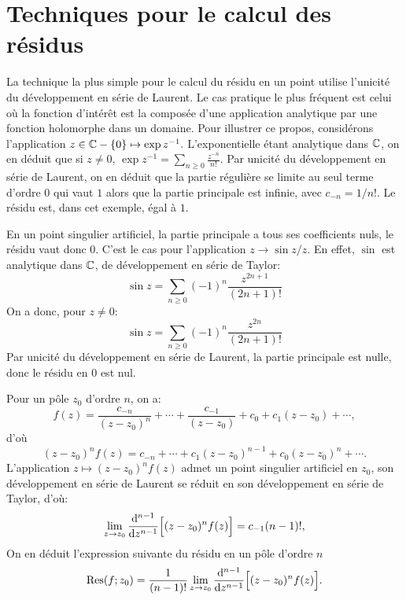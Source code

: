 
\section{Techniques pour le calcul des résidus}
La technique la plus simple pour le calcul du résidu en un point utilise l'unicité du développement en série de Laurent. Le cas pratique le plus fréquent est celui où la fonction d'intérêt est la composée d'une application analytique par une fonction holomorphe dans un domaine. Pour illustrer ce propos, considérons l'application $z  \in \mathbb{C} - \{0\} \mapsto \exp z^{-1}.$ L'exponentielle étant analytique dans $\mathbb{C}$, on en déduit que si $z \neq 0$, $\exp z^{-1} = \sum_{n \geq 0} \frac{z^{-n}}{n!}.$ Par unicité du développement en série de Laurent, on en déduit que la partie régulière se limite au seul terme d'ordre $0$ qui vaut $1$ alors que la partie principale est infinie, avec 
$c_{-n} = 1/n!.$ Le résidu est, dans cet exemple, égal à $1.$

En un point singulier artificiel, la partie principale a tous ses coefficients nuls, le résidu vaut donc $0.$ C'est le cas pour l'application $z \to \sin z / z.$ En effet, $\sin$ est analytique dans $\mathbb{C}$, de développement en série de Taylor:
\[
\sin z = \sum_{n \geq 0} (-1)^n \frac{z^{2n+1}}{(2n+1)!}
\]
On a donc, pour $z \neq 0$:
\[
\sin z = \sum_{n \geq 0} (-1)^n \frac{z^{2n}}{(2n+1)!}
\]
Par unicité du développement en série de Laurent, la partie principale est nulle, donc le résidu en $0$ est nul.

Pour un pôle $z_0$ d'ordre $n$, on a:
\[f(z)=\frac{c_{-n}}{(z-z_0)^n} + \cdots + \frac{c_{-1}}{(z-z_0)} + c_0 + c_1(z-z_0) + \cdots ,\]
d'où
\[(z-z_0)^n f(z)=c_{-n} + \cdots + c_1(z-z_0)^{n-1} + c_0 (z-z_0)^n + \cdots.\]
L'application $z \mapsto (z-z_0)^n f(z)$ admet un point singulier artificiel en $z_0$, son développement en série de Laurent se réduit en son développement en série de Taylor, d'où:
\[\lim_{z \to z_0}  \frac{\mathop{}\mathopen{}\mathrm{d}^{n-1}}{\mathop{}\mathopen{}\mathrm{d} z^{n-1}} \Bigl[(z-z_0)^n f(z) \Bigr] = c_{-1}(n-1)!,\]
On en déduit l'expression suivante du résidu en un pôle d'ordre $n$ 
\[\text{Res}(f;z_0) = \frac{1}{(n-1)!}\lim_{z \to z_0}  \frac{\mathop{}\mathopen{}\mathrm{d}^{n-1}}{\mathop{}\mathopen{}\mathrm{d} z^{n-1}} \Bigl[(z-z_0)^n f(z) \Bigr].\]

